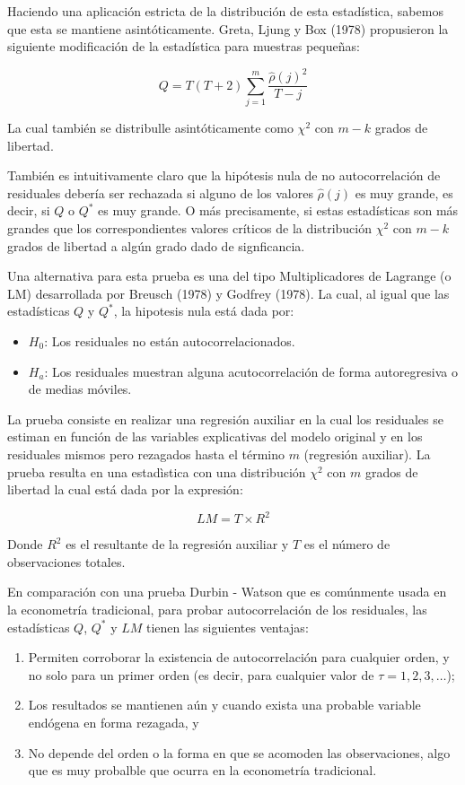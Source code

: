 \documentclass[
  a4paper,
]{article}
\begin{document}
Haciendo una aplicación estricta de la distribución de esta estadística,
sabemos que esta se mantiene asintóticamente. Greta, Ljung y Box (1978)
propusieron la siguiente modificación de la estadística para muestras
pequeñas:

\[
Q = T(T + 2) \sum_{j = 1}^{m} \frac{\hat{\rho} (j)^2}{T - j}
\]

La cual también se distribulle asintóticamente como \(\chi^2\) con
\(m-k\) grados de libertad.

También es intuitivamente claro que la hipótesis nula de no
autocorrelación de residuales debería ser rechazada si alguno de los
valores \(\hat{\rho} (j)\) es muy grande, es decir, si \(Q\) o \(Q^*\)
es muy grande. O más precisamente, si estas estadísticas son más grandes
que los correspondientes valores críticos de la distribución \(\chi^2\)
con \(m-k\) grados de libertad a algún grado dado de signficancia.

Una alternativa para esta prueba es una del tipo Multiplicadores de
Lagrange (o LM) desarrollada por Breusch (1978) y Godfrey (1978). La
cual, al igual que las estadísticas \(Q\) y \(Q^*\), la hipotesis nula
está dada por:

\begin{itemize}
\item
  \(H_0\): Los residuales no están autocorrelacionados.
\item
  \(H_a\): Los residuales muestran alguna acutocorrelación de forma
  autoregresiva o de medias móviles.
\end{itemize}

La prueba consiste en realizar una regresión auxiliar en la cual los
residuales se estiman en función de las variables explicativas del
modelo original y en los residuales mismos pero rezagados hasta el
término \(m\) (regresión auxiliar). La prueba resulta en una estadìstica
con una distribución \(\chi^2\) con \(m\) grados de libertad la cual
está dada por la expresión:

\[
LM = T \times R^2
\]

Donde \(R^2\) es el resultante de la regresión auxiliar y \(T\) es el
número de observaciones totales.

En comparación con una prueba Durbin - Watson que es comúnmente usada en
la econometría tradicional, para probar autocorrelación de los
residuales, las estadísticas \(Q\), \(Q^*\) y \(LM\) tienen las
siguientes ventajas:

\begin{enumerate}
\def\labelenumi{\arabic{enumi}.}
\item
  Permiten corroborar la existencia de autocorrelación para cualquier
  orden, y no solo para un primer orden (es decir, para cualquier valor
  de \(\tau = 1, 2, 3, \ldots\));
\item
  Los resultados se mantienen aún y cuando exista una probable variable
  endógena en forma rezagada, y
\item
  No depende del orden o la forma en que se acomoden las observaciones,
  algo que es muy probalble que ocurra en la econometría tradicional.
\end{enumerate}
\end{document}
